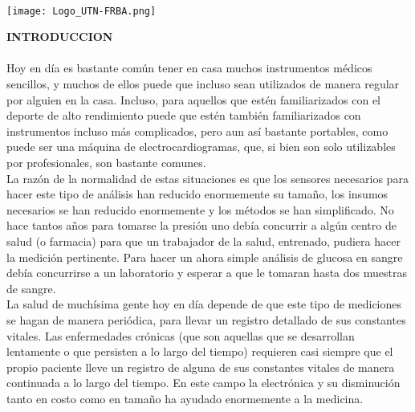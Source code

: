 \documentclass[11pt]{report}
\begin{document}
\begin{titlepage}
		
		\hfill
		\\[5cm]
		\hfill
		\vfill\vfill
		\texttt{[image: Logo\_UTN-FRBA.png]}\\[1cm] %
		
		
		\vfill %
		
	\end{titlepage}


\newpage
\noindent \Large \textbf{INTRODUCCION} \\
\\
Hoy en día es bastante común tener en casa muchos instrumentos médicos sencillos, y muchos de ellos puede que incluso sean  utilizados de manera regular por alguien en la casa. Incluso, para aquellos que estén familiarizados con el deporte de alto rendimiento puede que estén también familiarizados con instrumentos incluso más complicados, pero aun así bastante portables, como puede ser una máquina de electrocardiogramas, que, si bien son solo utilizables por profesionales, son bastante comunes. \\

La razón de la normalidad de estas situaciones es que los sensores necesarios para hacer este tipo de análisis han reducido enormemente su tamaño, los insumos necesarios se han reducido enormemente y los métodos se han simplificado. No hace tantos años para tomarse la presión uno debía concurrir a algún centro de salud (o
farmacia) para que un trabajador de la salud, entrenado, pudiera hacer la medición pertinente.  Para hacer un ahora simple análisis de glucosa en sangre debía  concurrirse a un laboratorio y esperar a que le tomaran hasta dos muestras de sangre.\\

La salud de muchísima gente hoy en día depende de que este tipo de mediciones se hagan de manera periódica, para llevar un registro detallado de sus constantes vitales. Las enfermedades crónicas (que son aquellas que se desarrollan lentamente o que persisten a lo largo del tiempo) requieren casi siempre que el propio paciente lleve un registro de
alguna de sus constantes vitales de manera continuada a lo largo del tiempo. En este campo la electrónica y su disminución tanto en costo como en tamaño ha ayudado enormemente a la medicina.\\
\end{document}
